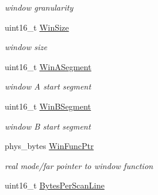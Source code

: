 \begin{DoxyCompactItemize}
\begin{DoxyCompactList}\small\item\em window granularity \end{DoxyCompactList}\item 
\hypertarget{struct____attribute_____a78985f1c5ae166cb560099273cc558b4}{uint16\-\_\-t \hyperlink{struct____attribute_____a78985f1c5ae166cb560099273cc558b4}{Win\-Size}}\label{struct____attribute_____a78985f1c5ae166cb560099273cc558b4}

\begin{DoxyCompactList}\small\item\em window size \end{DoxyCompactList}\item 
\hypertarget{struct____attribute_____a99b747099fd4d4271b0f0bc29f31c48f}{uint16\-\_\-t \hyperlink{struct____attribute_____a99b747099fd4d4271b0f0bc29f31c48f}{Win\-A\-Segment}}\label{struct____attribute_____a99b747099fd4d4271b0f0bc29f31c48f}

\begin{DoxyCompactList}\small\item\em window A start segment \end{DoxyCompactList}\item 
\hypertarget{struct____attribute_____a9edf422a931df7c7a1d5f82afb911566}{uint16\-\_\-t \hyperlink{struct____attribute_____a9edf422a931df7c7a1d5f82afb911566}{Win\-B\-Segment}}\label{struct____attribute_____a9edf422a931df7c7a1d5f82afb911566}

\begin{DoxyCompactList}\small\item\em window B start segment \end{DoxyCompactList}\item 
\hypertarget{struct____attribute_____affd250a4766543099f253e27af3abc35}{phys\-\_\-bytes \hyperlink{struct____attribute_____affd250a4766543099f253e27af3abc35}{Win\-Func\-Ptr}}\label{struct____attribute_____affd250a4766543099f253e27af3abc35}

\begin{DoxyCompactList}\small\item\em real mode/far pointer to window function \end{DoxyCompactList}\item 
\hypertarget{struct____attribute_____afe40654a51bf4a12a8b376ff3506688e}{uint16\-\_\-t \hyperlink{struct____attribute_____afe40654a51bf4a12a8b376ff3506688e}{Bytes\-Per\-Scan\-Line}}\label{struct____attribute_____afe40654a51bf4a12a8b376ff3506688e}


\end{DoxyCompactItemize}
